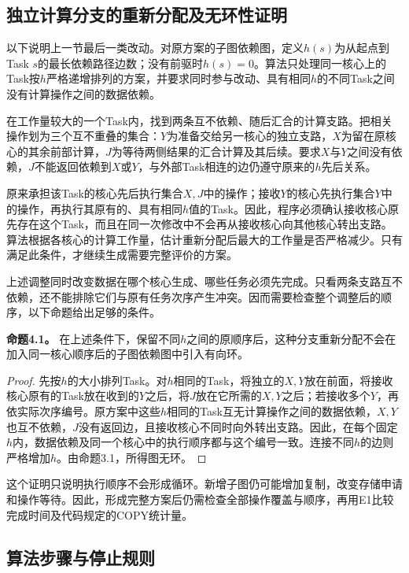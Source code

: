 \documentclass[anonymous,notoc]{gmcm2026}
\begin{document}
\subsection{独立计算分支的重新分配及无环性证明}

以下说明上一节最后一类改动。对原方案的子图依赖图，定义\(h(s)\)为从起点到Task \(s\)的最长依赖路径边数；没有前驱时\(h(s)=0\)。算法只处理同一核心上的Task按\(h\)严格递增排列的方案，并要求同时参与改动、具有相同\(h\)的不同Task之间没有计算操作之间的数据依赖。

在工作量较大的一个Task内，找到两条互不依赖、随后汇合的计算支路。把相关操作划为三个互不重叠的集合：\(Y\)为准备交给另一核心的独立支路，\(X\)为留在原核心的其余前部计算，\(J\)为等待两侧结果的汇合计算及其后续。要求\(X\)与\(Y\)之间没有依赖，\(J\)不能返回依赖到\(X\)或\(Y\)，与外部Task相连的边仍遵守原来的\(h\)先后关系。

原来承担该Task的核心先后执行集合\(X,J\)中的操作；接收\(Y\)的核心先执行集合\(Y\)中的操作，再执行其原有的、具有相同\(h\)值的Task。因此，程序必须确认接收核心原先存在这个Task，而且在同一次修改中不会再从接收核心向其他核心转出支路。算法根据各核心的计算工作量，估计重新分配后最大的工作量是否严格减少。只有满足此条件，才继续生成需要完整评价的方案。

上述调整同时改变数据在哪个核心生成、哪些任务必须先完成。只看两条支路互不依赖，还不能排除它们与原有任务次序产生冲突。因而需要检查整个调整后的顺序，以下命题给出足够的条件。

\textbf{命题4.1。} 在上述条件下，保留不同\(h\)之间的原顺序后，这种分支重新分配不会在加入同一核心顺序后的子图依赖图中引入有向环。

\begin{proof} 先按\(h\)的大小排列Task。对\(h\)相同的Task，将独立的\(X,Y\)放在前面，将接收核心原有的Task放在收到的\(Y\)之后，将\(J\)放在它所需的\(X,Y\)之后；若接收多个\(Y\)，再依实际次序编号。原方案中这些\(h\)相同的Task互无计算操作之间的数据依赖，\(X,Y\)也互不依赖，\(J\)没有返回边，且接收核心不同时向外转出支路。因此，在每个固定\(h\)内，数据依赖及同一个核心中的执行顺序都与这个编号一致。连接不同\(h\)的边则严格增加\(h\)。由命题3.1，所得图无环。\end{proof}

这个证明只说明执行顺序不会形成循环。新增子图仍可能增加复制，改变存储申请和操作等待。因此，形成完整方案后仍需检查全部操作覆盖与顺序，再用E1比较完成时间及代码规定的COPY统计量。

\subsection{算法步骤与停止规则}
\end{document}
